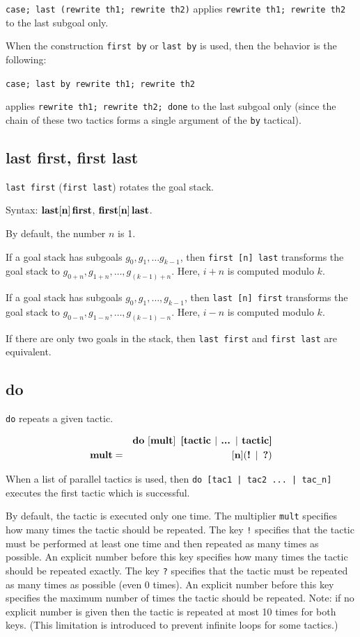 \documentclass[a4paper]{article}
\newcommand{\xx}[1]{\mathop{\text{\bf #1}}}
\begin{document}
\verb|case; last (rewrite th1; rewrite th2)| 
applies \verb|rewrite th1; rewrite th2| to the last subgoal only.

When the construction \verb|first by| or \verb|last by| is used, then the behavior is the following:

\verb|case; last by rewrite th1; rewrite th2| 

applies \verb|rewrite th1; rewrite th2; done| to the last subgoal only (since the chain of these two tactics forms a single argument of the \verb|by| tactical).


\subsection{last first, first last}
\verb|last first| (\verb|first last|) rotates the goal stack.

Syntax: $\xx{last} [\xx{n}] \xx{first}$, $\xx{first} [\xx{n}] \xx{last}$.

By default, the number $n$ is 1.

If a goal stack has subgoals $g_0, g_1, \ldots g_{k - 1}$, then \verb|first [n] last| transforms the goal stack to $g_{0 + n}, g_{1 + n}, \ldots, g_{(k - 1) + n}$. Here, $i + n$ is computed modulo $k$.

If a goal stack has subgoals $g_0, g_1, \ldots, g_{k - 1}$, then \verb|last [n] first| transforms the goal stack to $g_{0 - n}, g_{1 - n}, \ldots, g_{(k - 1) - n}$. Here, $i - n$ is computed modulo $k$.

If there are only two goals in the stack, then \verb|last first| and \verb|first last| are equivalent.


\subsection{do}
\verb|do| repeats a given tactic.

\begin{eqnarray*}
&&\xx{do}\ [\xx{mult}]\ \xx{[tactic $|$ ... $|$ tactic]}\\
\xx{mult} &=& [\xx{n}](\xx{!}\ |\ \xx{?})
\end{eqnarray*}

When a list of parallel tactics is used, then \verb$do [tac1 | tac2 ... | tac_n]$ executes the first tactic which is successful.

By default, the tactic is executed only one time. The multiplier \verb|mult| specifies how many times the tactic should be repeated. The key \verb|!| specifies that the tactic must be performed at least one time and then repeated as many times as possible. An explicit number before this key specifies how many times the tactic should be repeated exactly. The key \verb|?| specifies that the tactic must be repeated as many times as possible (even 0 times). An explicit number before this key specifies the maximum number of times the tactic should be repeated. Note: if no explicit number is given then the tactic is repeated at most 10 times for both keys. (This limitation is introduced to prevent infinite loops for some tactics.)
\end{document}
